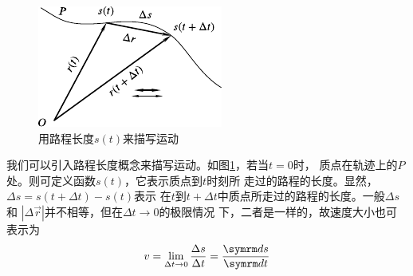 \setlength{\mathindent}{6em}
\begin{figure}
  \vspace{-6em}
  \centering
  \small
  \includegraphics{figure/fig01.13}
  \caption{用路程长度$s\left(t\right)$来描写运动}
  \label{fig:01.13}
\end{figure}
\noindent 我们可以引入路程长度概念来描写运动。如图\ref{fig:01.13}，若当$t=0$时，
质点在轨迹上的$P$处。则可定义函数$s\left(t\right)$，它表示质点到$t$时刻所
走过的路程的长度。显然，$\Delta s=s\left(t+\Delta t\right)-s\left(t\right)$表示
在$t$到$t+\Delta t$中质点所走过的路程的长度。一般$\Delta s$和
$|\Delta \vec{r}|$并不相等，但在$\Delta t \rightarrow 0$的极限情况
下，二者是一样的，故速度大小也可表示为
\begin{equation}\label{eqn:01.07.05}
  v=\lim_{\Delta t \rightarrow 0}\frac{\Delta s}{\Delta t}=\frac{\dif s}{\dif t}
\end{equation}

